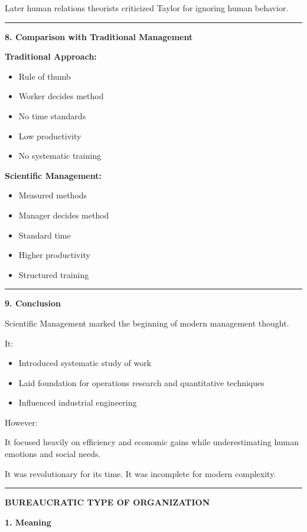 \documentclass[10pt,a4paper]{article}
\newcommand{\separator}{\vspace{0.4em}\noindent\rule{\linewidth}{0.6pt}\vspace{0.4em}}
\begin{document}
Later human relations theorists criticized Taylor for ignoring human behavior.

\separator

\textbf{8. Comparison with Traditional Management}

\textbf{Traditional Approach:}
\begin{itemize}
  \item Rule of thumb
  \item Worker decides method
  \item No time standards
  \item Low productivity
  \item No systematic training
\end{itemize}

\textbf{Scientific Management:}
\begin{itemize}
  \item Measured methods
  \item Manager decides method
  \item Standard time
  \item Higher productivity
  \item Structured training
\end{itemize}

\separator

\textbf{9. Conclusion}

Scientific Management marked the beginning of modern management thought.

It:

\begin{itemize}
  \item Introduced systematic study of work
  \item Laid foundation for operations research and quantitative techniques
  \item Influenced industrial engineering
\end{itemize}

However:

It focused heavily on efficiency and economic gains while underestimating human emotions
and social needs.

It was revolutionary for its time.
It was incomplete for modern complexity.

\separator

\begin{center}
  \large\textbf{BUREAUCRATIC TYPE OF ORGANIZATION}
\end{center}

\textbf{1. Meaning}
\end{document}
